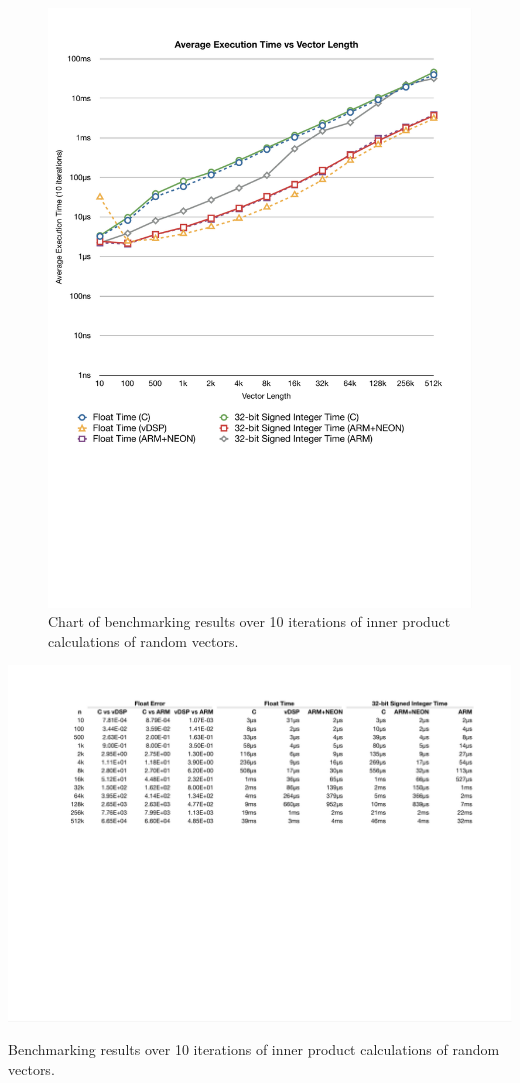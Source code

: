 \documentclass[oneside,a4paper]{report}
\begin{document}
\begin{figure}[htb]
	\centering
	\includegraphics[width=1.0\textwidth]{./fig/ResultsChart.pdf}
	\caption{Chart of benchmarking results over 10 iterations of inner product calculations of random vectors.}
	\label{fig:results}
\end{figure}

\begin{table}[p]
	\centering
	\includegraphics[width=1.0\textwidth]{./fig/ResultsTable.pdf}
	\caption{Benchmarking results over 10 iterations of inner product calculations of random vectors.}
	\label{tab:results}
\end{table}
\end{document}
